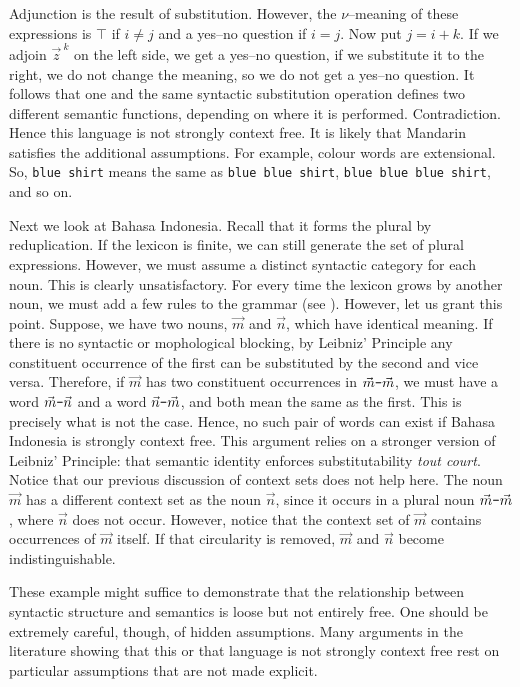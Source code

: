Adjunction is the result of substitution. However, the $\nu$--meaning 
of these expressions is $\top$ if $i \neq j$ and a yes--no question
if $i = j$. Now put $j = i+k$. If we adjoin ${\vec{z}\,}^k$ on the
left side, we get a yes--no question, if we substitute it to the
right, we do not change the meaning, so we do not get a yes--no question.
It follows that one and the same syntactic substitution operation
defines two different semantic functions, depending on where it is
performed. Contradiction. Hence this language is not strongly context 
free. It is likely that Mandarin satisfies the additional assumptions. 
For example, colour words are extensional. So, {\tt blue shirt} 
means the same as {\tt blue blue shirt}, {\tt blue blue blue shirt}, 
and so on.

Next we look at Bahasa Indonesia. Recall that it forms the plural by
reduplication. If the lexicon is finite, we can still generate the
set of plural expressions. However, we must assume a distinct
syntactic category for each noun. This is clearly unsatisfactory.
For every time the lexicon grows by another noun, we must add a
few rules to the grammar (see \cite{manasterramer:copying}). However, 
let us grant this point. Suppose, we have two nouns, $\vec{m}$ and
$\vec{n}$, which have identical meaning. If there is no syntactic 
or mophological blocking, by Leibniz' Principle any constituent 
occurrence of the first can be substituted by the second and vice 
versa. Therefore, if $\vec{m}$ has two constituent
occurrences in $\vec{m}\mbox{\tt -}\vec{m}$, we must have a word
$\vec{m}\mbox{\tt -}\vec{n}$ and a word $\vec{n}\mbox{\tt
-}\vec{m}$, and both mean the same as the first. This is precisely
what is not the case. Hence, no such pair of words can exist if
Bahasa Indonesia is strongly context free. This argument relies 
on a stronger version of Leibniz' Principle: that semantic identity 
enforces substitutability {\it tout court}. Notice that our
previous discussion of context sets does not help here. The noun
$\vec{m}$ has a different context set as the noun $\vec{n}$, since
it occurs in a plural noun $\vec{m}\mbox{\tt -}\vec{m}$, where
$\vec{n}$ does not occur. However, notice that the context set of
$\vec{m}$ contains occurrences of $\vec{m}$ itself. If that
circularity is removed, $\vec{m}$ and $\vec{n}$ become
indistinguishable.

These example might suffice to demonstrate that the relationship 
between syntactic structure and semantics is loose but not entirely 
free. One should be extremely careful, though, of hidden assumptions. 
Many arguments in the literature showing that this or that 
language is not strongly context free rest on particular assumptions 
that are not made explicit. 

